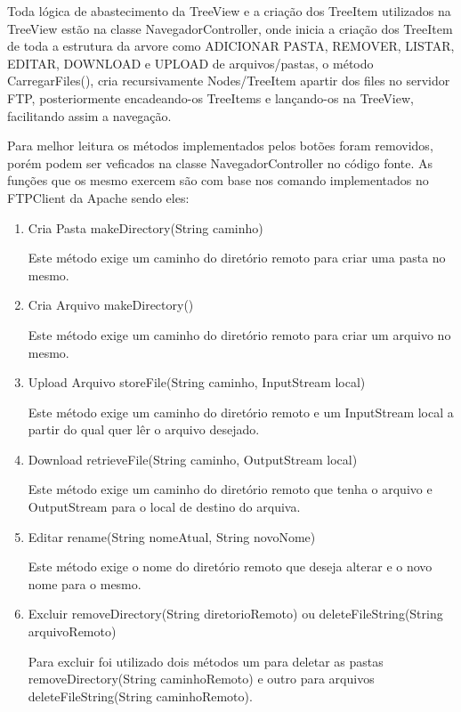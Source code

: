 \documentclass[12pt]{article}
\begin{document}
Toda lógica de abastecimento da TreeView e a criação dos TreeItem utilizados na TreeView estão na classe NavegadorController, onde inicia a criação dos TreeItem de toda a estrutura da arvore como ADICIONAR PASTA, REMOVER, LISTAR, EDITAR, DOWNLOAD e UPLOAD de arquivos/pastas, o método CarregarFiles(), cria recursivamente Nodes/TreeItem apartir dos files no servidor FTP, posteriormente encadeando-os TreeItems e lançando-os na TreeView, facilitando assim a navegação.

Para melhor leitura os métodos implementados pelos botões foram removidos, porém podem ser veficados na classe NavegadorController no código fonte. As funções que os mesmo exercem são com base nos comando implementados no FTPClient da Apache sendo eles:
\begin{enumerate}
\item {Cria Pasta} makeDirectory(String caminho)	
	
Este método exige um caminho do diretório remoto para criar uma pasta no mesmo.  
	
\item {Cria Arquivo} makeDirectory()	
	
Este método exige um caminho do diretório remoto para criar um arquivo no mesmo.

\item {Upload Arquivo } storeFile(String caminho, InputStream local)	

Este método exige um caminho do diretório remoto e um InputStream local a partir do qual quer lêr o arquivo desejado.

\item {Download } retrieveFile(String caminho, OutputStream local)	

Este método exige um caminho do diretório remoto que tenha o arquivo e OutputStream para o local de destino do arquiva.

\item {Editar} rename(String nomeAtual, String novoNome)	

Este método exige o nome do diretório remoto que deseja alterar e o novo nome para o mesmo.  

\item {Excluir} removeDirectory(String diretorioRemoto) ou  deleteFileString(String arquivoRemoto) 

Para excluir foi utilizado dois métodos um para deletar as pastas removeDirectory(String caminhoRemoto) e outro para arquivos deleteFileString(String caminhoRemoto).

\end{enumerate}
\end{document}
